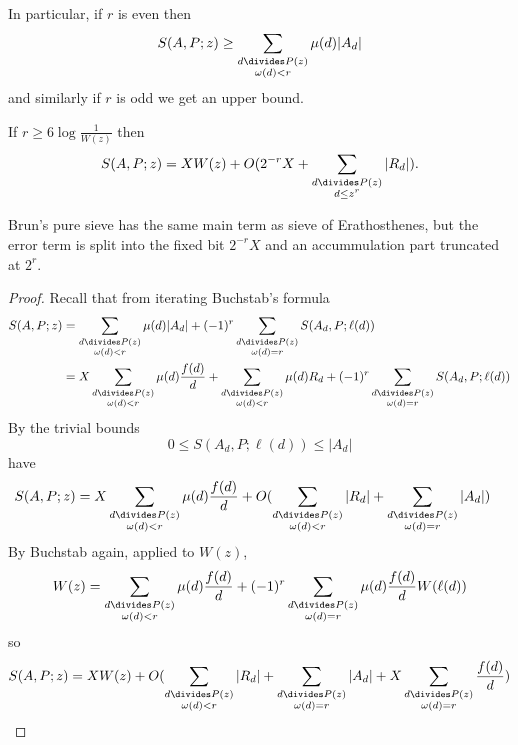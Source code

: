 \documentclass[a4paper]{article}
\begin{document}
In particular, if \(r\) is even then
\[
  S(A, P; z) \geq \sum_{\substack{d \divides P(z) \\ \omega(d) < r}} \mu(d) |A_d|
\]
and similarly if \(r\) is odd we get an upper bound.

\begin{theorem}
  If \(r \geq 6 \log \frac{1}{W(z)}\) then
  \[
    S(A, P; z) = XW(z) + O(2^{-r} X + \sum_{\substack{d \divides P(z) \\ d \leq z^r}} |R_d|).
  \]
\end{theorem}

Brun's pure sieve has the same main term as sieve of Erathosthenes, but the error term is split into the fixed bit \(2^{-r}X\) and an accummulation part truncated at \(2^r\).

\begin{proof}
  Recall that from iterating Buchstab's formula
  \begin{align*}
    S(A, P; z)
    &= \sum_{\substack{d \divides P(z) \\ \omega(d) < r}} \mu(d) |A_d| + (-1)^r \sum_{\substack{d \divides P(z) \\ \omega(d) = r}} S(A_d, P; \ell(d)) \\
    &= X \sum_{\substack{d \divides P(z) \\ \omega(d) < r}} \mu(d) \frac{f(d)}{d} + \sum_{\substack{d \divides P(z) \\ \omega(d) < r}} \mu(d) R_d + (-1)^r \sum_{\substack{d \divides P(z) \\ \omega(d) = r}} S(A_d, P; \ell(d))
  \end{align*}
  By the trivial bounds
  \[
    0 \leq S(A_d, P; \ell(d)) \leq |A_d|
  \]
  have
  \begin{align*}
    S(A, P; z)
    &= X \sum_{\substack{d \divides P(z) \\ \omega(d) < r}} \mu(d) \frac{f(d)}{d} + O(\sum_{\substack{d \divides P(z) \\ \omega(d) < r}} |R_d| + \sum_{\substack{d \divides P(z) \\ \omega(d) = r}} |A_d|)
  \end{align*}
  By Buchstab again, applied to \(W(z)\),
  \[
    W(z)
    = \sum_{\substack{d \divides P(z) \\ \omega(d) < r}} \mu(d) \frac{f(d)}{d} + (-1)^r \sum_{\substack{d \divides P(z) \\ \omega(d) = r}} \mu(d) \frac{f(d)}{d} W(\ell(d))
  \]
  so
  \[
    S(A, P; z) = XW(z) + O(\sum_{\substack{d \divides P(z) \\ \omega(d) < r}} |R_d| + \sum_{\substack{d \divides P(z) \\ \omega(d) = r}} |A_d| + X\sum_{\substack{d \divides P(z) \\ \omega(d) = r}} \frac{f(d)}{d})
\]
\end{proof}
\end{document}
